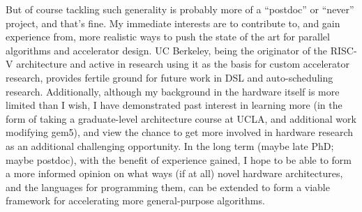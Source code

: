 But of course tackling such generality is probably more of a ``postdoc'' or ``never'' project, and that's fine. My immediate interests are to contribute to, and gain experience from, more realistic ways to push the state of the art for parallel algorithms and accelerator design. UC Berkeley, being the originator of the RISC-V architecture and active in research using it as the basis for custom accelerator research, provides fertile ground for future work in DSL and auto-scheduling research. Additionally, although my background in the hardware itself is more limited than I wish, I have demonstrated past interest in learning more (in the form of taking a graduate-level architecture course at UCLA, and additional work modifying gem5), and view the chance to get more involved in hardware research as an additional challenging opportunity. In the long term (maybe late PhD; maybe postdoc), with the benefit of experience gained, I hope to be able to form a more informed opinion on what ways (if at all) novel hardware architectures, and the languages for programming them, can be extended to form a viable framework for accelerating more general-purpose algorithms.


